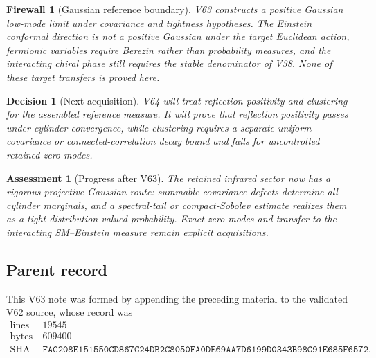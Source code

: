 \documentclass[11pt]{article}
\newtheorem{assessment}[theorem]{Assessment}
\newtheorem{firewall}[theorem]{Firewall}
\newtheorem{decision}[theorem]{Decision}
\begin{document}
\begin{firewall}[Gaussian reference boundary]
\label{fire:v11v63-boundary}
V63 constructs a positive Gaussian low-mode limit under covariance and
tightness hypotheses.  The Einstein conformal direction is not a
positive Gaussian under the target Euclidean action, fermionic
variables require Berezin rather than probability measures, and the
interacting chiral phase still requires the stable denominator of
V38.  None of these target transfers is proved here.
\end{firewall}

\begin{decision}[Next acquisition]
\label{dec:v11v63-next}
V64 will treat reflection positivity and clustering for the assembled
reference measure.  It will prove that reflection positivity passes
under cylinder convergence, while clustering requires a separate
uniform covariance or connected-correlation decay bound and fails for
uncontrolled retained zero modes.
\end{decision}

\begin{assessment}[Progress after V63]
\label{ass:v11v63-status}
The retained infrared sector now has a rigorous projective Gaussian
route: summable covariance defects determine all cylinder marginals,
and a spectral-tail or compact-Sobolev estimate realizes them as a
tight distribution-valued probability.  Exact zero modes and transfer
to the interacting SM--Einstein measure remain explicit acquisitions.
\end{assessment}

\subsection{Parent record}

This V63 note was formed by appending the preceding material to the
validated V62 source, whose record was
\[
\begin{array}{c|c}
\text{lines}&19545\\
\text{bytes}&609400\\
\text{SHA--256}&
\texttt{FAC208E151550CD867C24DB2C8050FA0DE69AA7D6199D0343B98C91E685F6572}.
\end{array}                                                     \tag{63.18}
\]

\end{document}
